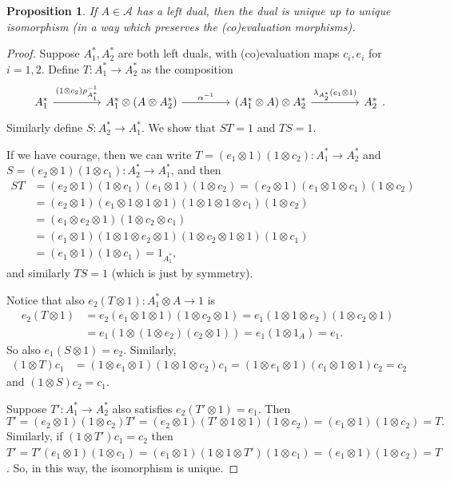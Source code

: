 \documentclass[a4paper,11pt]{article}
\theoremstyle{plain}
\newtheorem{proposition}{Proposition}[section]
\theoremstyle{remark}
\newcommand{\mc}[1]{\mathcal{#1}}
\begin{document}
\begin{proposition}\label{prop:left_dual_unique}
If $A\in\mc A$ has a left dual, then the dual is unique up to unique isomorphism (in a way which preserves the (co)evaluation morphisms).
\end{proposition}
\begin{proof}
Suppose $A_1^*, A_2^*$ are both left duals, with (co)evaluation maps $c_i, e_i$ for $i=1,2$.  Define $T \colon A_1^* \to A_2^*$ as the composition
\[\begin{tikzcd}[column sep=10ex]
A_1^* \ar[r, "(1\otimes c_2)\rho_{A_1^*}^{-1}"]
& A_1^*\otimes(A\otimes A_2^*) \ar[r, "\alpha^{-1}"]
& (A_1^*\otimes A) \otimes A_2^* \ar[r, "\lambda_{A_2^*}(e_1\otimes 1)"]
& A_2^*
\end{tikzcd}.\]
Similarly define $S \colon A_2^* \to A_1^*$.  We show that $ST=1$ and $TS=1$.

If we have courage, then we can write $T = (e_1\otimes 1)(1\otimes c_2)\colon A_1^*\to A_2^*$ and $S = (e_2\otimes 1)(1\otimes c_1)\colon A_2^*\to A_1^*$, and then
\begin{align*}
ST &= (e_2\otimes 1)(1\otimes c_1)(e_1\otimes 1)(1\otimes c_2)
= (e_2\otimes 1)(e_1\otimes 1 \otimes c_1)(1\otimes c_2) \\
&= (e_2\otimes 1)(e_1\otimes 1\otimes 1\otimes 1)(1\otimes 1\otimes 1\otimes c_1)(1\otimes c_2) \\
&= (e_1\otimes e_2\otimes 1)(1\otimes c_2\otimes c_1) \\
&= (e_1\otimes 1)(1\otimes 1\otimes e_2\otimes 1)(1\otimes c_2\otimes 1\otimes 1)(1\otimes c_1) \\
&= (e_1\otimes 1)(1\otimes c_1) = 1_{A_1^*},
\end{align*}
and similarly $TS=1$ (which is just by symmetry).

Notice that also $e_2 (T\otimes 1) \colon A_1^* \otimes A \to 1$ is
\begin{align*}
e_2 (T\otimes 1)
&= e_2 (e_1\otimes 1\otimes 1)(1\otimes c_2\otimes 1) 
= e_1 (1\otimes 1\otimes e_2)(1\otimes c_2\otimes 1) \\
&= e_1 (1 \otimes (1\otimes e_2)(c_2\otimes 1)) = e_1 (1\otimes 1_A) = e_1.
\end{align*}
So also $e_1 (S\otimes 1) = e_2$.  Similarly,
\begin{align*}
(1\otimes T)c_1 &= (1\otimes e_1\otimes 1)(1\otimes 1\otimes c_2)c_1
= (1\otimes e_1\otimes 1)(c_1\otimes 1\otimes 1) c_2
= c_2
\end{align*}
and $(1\otimes S)c_2 = c_1$.

Suppose $T' \colon A_1^* \to A_2^*$ also satisfies $e_2(T'\otimes 1) = e_1$.  Then
\[ T' = (e_2\otimes 1)(1\otimes c_2) T' = (e_2 \otimes 1)(T'\otimes 1\otimes 1)(1\otimes c_2)
= (e_1\otimes 1)(1\otimes c_2) = T. \]
Similarly, if $(1\otimes T')c_1 = c_2$ then $T' = T' (e_1\otimes 1)(1\otimes c_1) = (e_1\otimes 1)(1\otimes 1\otimes T')(1\otimes c_1) = (e_1\otimes 1)(1\otimes c_2) = T$.  So, in this way, the isomorphism is unique.
\end{proof}
\end{document}

